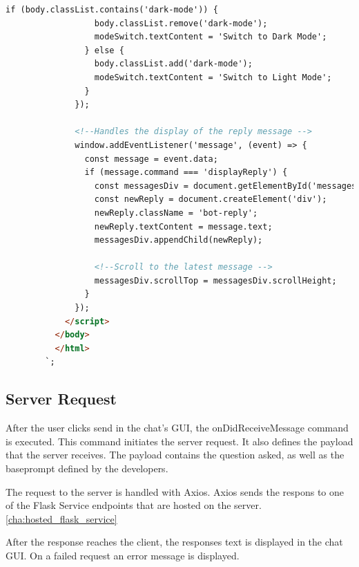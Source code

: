 \begin{lstlisting}[language=HTML, caption={IDE Chat GUI}]
                if (body.classList.contains('dark-mode')) {
                  body.classList.remove('dark-mode');
                  modeSwitch.textContent = 'Switch to Dark Mode';
                } else {
                  body.classList.add('dark-mode');
                  modeSwitch.textContent = 'Switch to Light Mode';
                }
              });
      
              <!--Handles the display of the reply message -->
              window.addEventListener('message', (event) => {
                const message = event.data;
                if (message.command === 'displayReply') {
                  const messagesDiv = document.getElementById('messages');
                  const newReply = document.createElement('div');
                  newReply.className = 'bot-reply';
                  newReply.textContent = message.text;
                  messagesDiv.appendChild(newReply);
      
                  <!--Scroll to the latest message -->
                  messagesDiv.scrollTop = messagesDiv.scrollHeight;
                }
              });
            </script>
          </body>
          </html>
        `;
\end{lstlisting}



\subsection{Server Request}

After the user clicks send in the chat's GUI, the onDidReceiveMessage command is executed. This command initiates the server request.
It also defines the payload that the server receives. The payload contains the question asked, as well as the baseprompt defined by the developers. 

The request to the server is handled with Axios. Axios sends the respons to one of the Flask Service endpoints that are hosted on the server.
\ref{cha:hosted_flask_service}

After the response reaches the client, the responses text is displayed in the chat GUI. On a failed request an error message is displayed.

